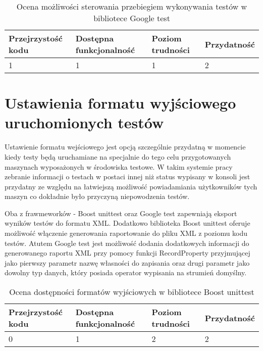 \documentclass[12pt,a4paper,notitlepage]{report}
\begin{document}
\begin{center}
			\begin{table}[!ht]
			\caption{Ocena możliwości sterowania przebiegiem wykonywania testów w bibliotece Google test}
			\label{}
			\begin{tabular}[!hc]{|l|l|l|l|}
		\hline
		Przejrzystość kodu 	&	Dostępna funkcjonalność	&	Poziom trudności	&	Przydatność \\ \hline
		1					&	1						&	1					& 	2  			\\ \hline
			\end{tabular}
			\end{table} 
		\end{center}

\chapter{Ustawienia formatu wyjściowego uruchomionych testów}

Ustawienie formatu wejściowego jest opcją szczególnie przydatną w momencie kiedy testy będą uruchamiane na specjalnie do tego celu przygotowanych maszynach wyposażonych w środowiska testowe. W takim systemie pracy zebranie informacji o testach w postaci innej niż status wypisany w konsoli jest przydatny ze względu na łatwiejszą możliwość powiadamiania użytkowników tych maszyn co dokładnie było przyczyną niepowodzenia testów.

Oba z frawmeworków - Boost unittest oraz Google test zapewniają eksport wyników testów do formatu XML. Dodatkowo biblioteka Boost unittest oferuje możliwość włączenie generowania raportowanie do pliku XML z poziomu kodu testów. Atutem Google test jest możliwość dodania dodatkowych informacji do generowanego raportu XML przy pomocy funkcji RecordProperty przyjmującej jako pierwszy parametr nazwę własności do zapisania oraz drugi parametr jako dowolny typ danych, który posiada operator wypisania na strumień domyślny.

\begin{center}
			\begin{table}[!ht]
			\caption{Ocena dostępności formatów wyjściowych w bibliotece Boost unittest}
			\label{}
			\begin{tabular}[!hc]{|l|l|l|l|}
		\hline
		Przejrzystość kodu 	&	Dostępna funkcjonalność	&	Poziom trudności	&	Przydatność \\ \hline
		0					&	1						&	2					& 	2  			\\ \hline
			\end{tabular}
			\end{table} 
		\end{center}
\end{document}
